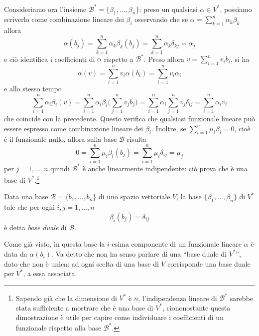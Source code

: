 Consideriamo ora l'insieme $\mathcal B^*=\{\beta_1,\dots,\beta_n\}$: preso un qualsiasi $\alpha\in V^*$, possiamo scriverlo come combinazione lineare dei $\beta_i$ osservando che se $\alpha=\sum_{k=1}^n\alpha_k\beta_k$ allora
\begin{equation}
	\alpha(b_j)=\sum_{k=1}^n\alpha_k\beta_k(b_j)=\sum_{k=1}^n\alpha_k\delta_{kj}=\alpha_j
\end{equation}
e ciò identifica i coefficienti di $\alpha$ rispetto a $\mathcal B^*$.
Preso allora $v=\sum_{i=1}^nv_ib_i$, si ha
\begin{equation}
	\alpha(v)=\sum_{i=1}^nv_i\alpha(b_i)=\sum_{i=1}^nv_i\alpha_i
\end{equation}
e allo stesso tempo
\begin{equation}
	\sum_{i=1}^n\alpha_i\beta_i(v)=\sum_{i=1}^n\alpha_i\beta_i\bigg(\sum_{j=1}^nv_jb_j\bigg)=\sum_{i=1}^n\alpha_i\sum_{j=1}^nv_j\delta_{ij}=\sum_{i=1}^n\alpha_iv_i
\end{equation}
che coincide con la precedente.
Questo verifica che qualsiasi funzionale lineare può essere espresso come combinazione lineare dei $\beta_i$.
Inoltre, se $\sum_{i=1}^n\mu_i\beta_i=0$, cioè è il funzionale nullo, allora sulla base $\mathcal B$ risulta
\begin{equation}
	0=\sum_{i=1}^n\mu_i\beta_i(b_j)=\sum_{i=1}^n\mu_i\delta_{ij}=\mu_j
\end{equation}
per $j=1,\dots,n$ quindi $\mathcal B^*$ è anche linearmente indipendente: ciò prova che è una base di $V^*$.\footnote{
	Sapendo già che la dimensione di $V^*$ è $n$, l'indipendenza lineare di $\mathcal B^*$ sarebbe stata sufficiente a mostrare che è una base di $V^*$, ciononostante questa dimostrazione è utile per capire come individuare i coefficienti di un funzionale rispetto alla base $\mathcal B^*$.
}
\begin{definizione} \label{d:base-duale}
	Data una base $\mathcal B=\{b_1,\dots,b_n\}$ di uno spazio vettoriale $V$, la base $\{\beta_1,\dots,\beta_n\}$ di $V^*$ tale che per ogni $i,j=1,\dots,n$
	\begin{equation}
		\beta_i(b_j)=\delta_{ij}
	\end{equation}
	è detta \emph{base duale} di $\mathcal B$.
\end{definizione}
Come già visto, in questa base la $i$-esima componente di un funzionale lineare $\alpha$ è data da $\alpha(b_i)$.
Va detto che non ha senso parlare di una ``base duale di $V^*$'', dato che non è unica: ad ogni scelta di una base di $V$ corrisponde una base duale per $V^*$, a essa associata.
